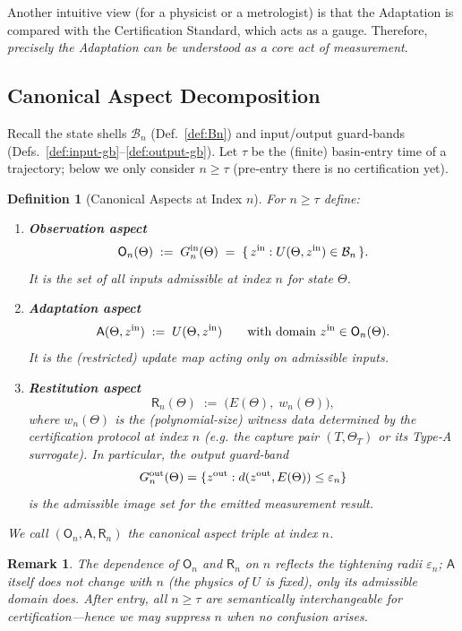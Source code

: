 \documentclass[12pt]{article}
\newtheorem{definition}{Definition}[section]
\newtheorem{remark}{Remark}[section]
\begin{document}
Another intuitive view (for a physicist or a metrologist) is that the Adaptation is compared with the Certification Standard, which acts as a gauge. Therefore, \textit{precisely the Adaptation can be understood as a core act of measurement}.

\subsection*{Canonical Aspect Decomposition}

Recall the state shells $\mathcal B_n$ (Def.~\ref{def:Bn}) and input/out\-put guard‑bands (Defs.~\ref{def:input-gb}–\ref{def:output-gb}).  Let $\tau$ be the (finite) basin‑entry time of a trajectory; below we only consider $n\ge\tau$ (pre‑entry there is no certification yet).

\begin{definition}[Canonical Aspects at Index $n$]\label{def:canonical-aspects}
For $n\ge\tau$ define:
\begin{enumerate}
\item \textbf{Observation aspect}
\[
  \mathsf O_n(\Theta) \;:=\; G^{\rm in}_n(\Theta)
  \;=\; \{\,z^{\rm in}: U(\Theta,z^{\rm in})\in\mathcal B_n\,\}.
\]
It is the set of all inputs \emph{admissible} at index $n$ for state $\Theta$.

\item \textbf{Adaptation aspect}
\[
  \mathsf A(\Theta,z^{\rm in}) \;:=\; U(\Theta,z^{\rm in})
  \qquad\text{with domain } z^{\rm in}\in \mathsf O_n(\Theta).
\]
It is the (restricted) update map acting only on admissible inputs.

\item \textbf{Restitution aspect}
\[
  \mathsf R_n(\Theta) \;:=\; \bigl(E(\Theta),\; w_n(\Theta)\bigr),
\]
where $w_n(\Theta)$ is \emph{the} (polynomial‑size) witness data determined by the certification protocol at index $n$ (e.g. the capture pair $(T,\Theta_T)$ or its Type‑A surrogate).  In particular, the \emph{output guard‑band}
\[
  G^{\rm out}_n(\Theta) 
  = \{z^{\rm out}: d(z^{\rm out},E(\Theta))\le\varepsilon_n\}
\]
is the admissible image set for the emitted measurement result.
\end{enumerate}
We call $(\mathsf O_n,\mathsf A,\mathsf R_n)$ the \emph{canonical aspect triple} at index $n$.
\end{definition}

\begin{remark}
The dependence of $\mathsf O_n$ and $\mathsf R_n$ on $n$ reflects the tightening radii $\varepsilon_n$; $\mathsf A$ itself does not change with $n$ (the physics of $U$ is fixed), only its admissible domain does.  After entry, all $n\ge\tau$ are semantically interchangeable for certification—hence we may suppress $n$ when no confusion arises.
\end{remark}
\end{document}
